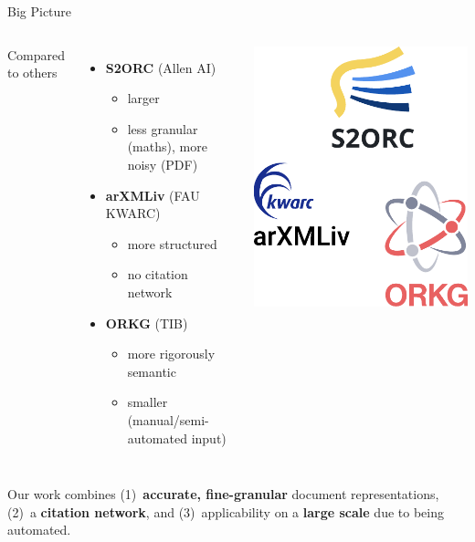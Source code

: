 \documentclass[en,16:9,smallfoot]{sdqbeamer}
\begin{document}
   \begin{frame}[t]{Big Picture}
   \begin{columns}
        Compared to others

        \begin{itemize}
            \item \textbf{S2ORC} (Allen AI)
            \begin{itemize}
                \item larger
                \item less granular {\color{contextgrey}(maths)}, more noisy {\color{contextgrey}(PDF)}
            \end{itemize}
            \item \textbf{arXMLiv} (FAU KWARC)
            \begin{itemize}
                \item more structured
                \item no citation network
            \end{itemize}
            \item \textbf{ORKG} (TIB)
            \begin{itemize}
                \item more rigorously semantic
                \item smaller {\color{contextgrey}(manual/semi-automated input)}
            \end{itemize}
        \end{itemize}

            \includegraphics[width=0.5\linewidth]{imgs/relwork_v2}
   \end{columns}
   \vspace{1.5em}
   Our work combines (1)~\textbf{accurate, fine-granular} document representations,\\(2)~a \textbf{citation network}, and (3)~applicability on a \textbf{large scale} due to being automated.
   \end{frame}
\end{document}
